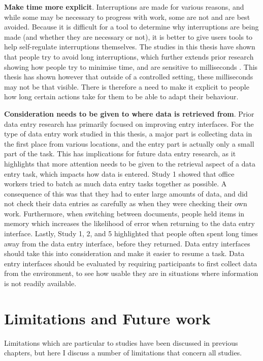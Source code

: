 \textbf{Make time more explicit}. Interruptions are made for various reasons, and while some may be necessary to progress with work, some are not and are best avoided. Because it is difficult for a tool to determine why interruptions are being made (and whether they are necessary or not), it is better to give users tools to help self-regulate interruptions themselves. The studies in this thesis have shown that people try to avoid long interruptions, which further extends prior research showing how people try to minimise time, and are sensitive to milliseconds \citep{Gray2006}. This thesis has shown however that outside of a controlled setting, these milliseconds may not be that visible. There is therefore a need to make it explicit to people how long certain actions take for them to be able to adapt their behaviour.

\textbf{Consideration needs to be given to where data is retrieved from}. Prior data entry research has primarily focused on improving entry interfaces. For the type of data entry work studied in this thesis, a major part is collecting data in the first place from various locations, and the entry part is actually only a small part of the task. This has implications for future data entry research, as it highlights that more attention needs to be given to the retrieval aspect of a data entry task, which impacts how data is entered. Study 1 showed that office workers tried to batch as much data entry tasks together as possible. A consequence of this was that they had to enter large amounts of data, and did not check their data entries as carefully as when they were checking their own work. Furthermore, when switching between documents, people held items in memory which increases the likelihood of error when returning to the data entry interface. Lastly, Study 1, 2, and 5 highlighted that people often spent long times away from the data entry interface, before they returned. Data entry interfaces should take this into consideration and make it easier to resume a task. Data entry interfaces should be evaluated by requiring participants to first collect data from the environment, to see how usable they are in situations where information is not readily available. 

\section{Limitations and Future work}
Limitations which are particular to studies have been discussed in previous chapters, but here I discuss a number of limitations that concern all studies. 

